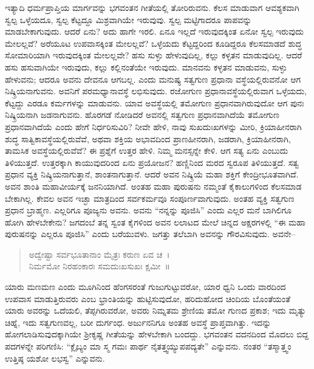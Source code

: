 ಇತ್ಯಾದಿ ಧರ್ಮಪ್ರಾಪ್ತಿಯ ಮಾರ್ಗವನ್ನು ಭಗವಂತನ ಗೀತೆಯಲ್ಲಿ ತೋರಿರುವನು. ಕೆಲಸ ಮಾಡುವಾಗ ಆವಶ್ಯಕವಾಗಿ ಸ್ವಲ್ಪ ಒಳ್ಳೆಯದೂ, ಸ್ವಲ್ಪ ಕೆಟ್ಟದ್ದೂ ಮಿಶ್ರವಾಗಿಯೇ ಇರುವುವು. ಸ್ವಲ್ಪ ಮಟ್ಟಿಗಾದರೂ ಪಾಪವನ್ನು ಮಾಡಬೇಕಾಗುವುದು. ಆದರೆ ಏನು? ಅದು ಹಾಗೇ ಇರಲಿ. ಏನೂ ಇಲ್ಲದೆ ಇರುವುದಕ್ಕಿಂತ ಏನೋ ಸ್ವಲ್ಪ ಇರುವುದು ಮೇಲಲ್ಲವೆ? ಅರೆಯೂಟ ಉಪವಾಸಕ್ಕಿಂತ ಮೇಲಲ್ಲವೆ? ಒಳ್ಳೆಯದು ಕೆಟ್ಟದ್ದರಿಂದ ಕೂಡಿದ್ದರೂ ಕೆಲಸ\-ಮಾಡದೆ ಶುದ್ಧ ಸೋಮಾರಿಯಾಗಿ ಇರುವುದಕ್ಕಿಂತ ಮೇಲಲ್ಲವೇ? ಹಸು ಸುಳ್ಳು ಹೇಳುವುದಿಲ್ಲ, ಕಲ್ಲು ಕಳ್ಳತನ ಮಾಡುವುದಿಲ್ಲ. ಆದರೆ ಹಸು ಹಸುವಾಗಿಯೇ ಇರುವುದು, ಕಲ್ಲು ಕಲ್ಲಿನಂತೆಯೇ ಇರುವುದು. ಮಾನವನು ಕಳ್ಳತನ ಮಾಡುವನು, ಸುಳ್ಳು ಹೇಳುವನು; ಆದರೂ ಅವನು ದೇವನೂ ಆಗಬಲ್ಲ. ಎಂದು ಮನುಷ್ಯ ಸತ್ವಗುಣ ಪ್ರಧಾನಾ ವಸ್ಥೆಯಲ್ಲಿರುವನೋ ಆಗ ನಿಷ್ಕ್ರಿಯನಾಗುವನು. ಅವನಿಗೆ ಪರಮಧ್ಯಾನಾವಸ್ಥೆ ಲಭಿಸುವುದು. ರಜೋಗುಣ ಪ್ರಧಾನಾವಸ್ಥೆಯಲ್ಲಿರುವಾಗ ಒಳ್ಳೆಯದು, ಕೆಟ್ಟದ್ದು ಎರಡೂ ಕರ್ಮಗಳನ್ನು ಮಾಡುವನು. ಯಾವ ಅವಸ್ಥೆಯಲ್ಲಿ ತಮೋಗುಣ ಪ್ರಧಾನವಾಗಿರುವುದೋ ಆಗ ಪುನಃ ನಿಷ್ಕ್ರಿಯನಾಗಿ ಜಡನಾಗುವನು. ಹೊರಗಡೆ ನೋಡಿದರೆ ಅವನಲ್ಲಿ ಸತ್ವಗುಣ ಪ್ರಧಾನವಾಗಿದೆಯೆ ತಮೋಗುಣ ಪ್ರಧಾನವಾಗಿದೆಯೆ ಎಂದು ಹೇಗೆ ನಿರ್ಧರಿಸುವಿರಿ? ನೀವೇ ಹೇಳಿ, ನಾವು ಸುಖದುಃಖಗಳನ್ನು ಮೀರಿ, ಕ್ರಿಯಾಹೀನರಾಗಿ ಶುದ್ಧ ಸಾತ್ವಿಕಾವಸ್ಥೆ\-ಯಲ್ಲಿರುವೆವೆ, ಅಥವಾ ಶಕ್ತಿಯ ಅಭಾವದಿಂದ ಪ್ರಾಣಹೀನರಾಗಿ, ಜಡರಾಗಿ, ಕ್ರಿಯಾಹೀನ\-ರಾಗಿ, ತಾಮಸಿಕ ಅವಸ್ಥೆಯಲ್ಲಿರುವೆವೆ? ಈ ಪ್ರಶ್ನೆಗೆ ಉತ್ತರ ಹೇಳಿ. ನಿಮ್ಮ ಮನಸ್ಸನ್ನೇ ಕೇಳಿ. ಆಗ ಸತ್ಯ ಏನು ಎಂಬುದು ತಿಳಿಯುತ್ತದೆ. ಉತ್ತರಕ್ಕಾಗಿ ಕಾಯುವುದರಿಂದ ಏನು ಪ್ರಯೋಜನ? ಹಣ್ಣಿನಿಂದ ಮರದ ಸ್ವರೂಪ ತಿಳಿಯುತ್ತದೆ. ಸತ್ವ ಪ್ರಧಾನ ವ್ಯಕ್ತಿ ನಿಷ್ಕ್ರಿಯನಾಗುತ್ತಾನೆ, ಶಾಂತನಾಗುತ್ತಾನೆ. ಆದರೆ ಅವನ ನಿಷ್ಕ್ರಿಯೆ ಮಹಾ ಶಕ್ತಿಗೆ ಕೇಂದ್ರೀ\-ಭೂತವಾಗಿದೆ. ಅವನ ಶಾಂತಿ ಮಹಾವೀರ್ಯಕ್ಕೆ ಜನನಿಯಾಗಿದೆ. ಅಂತಹ ಮಹಾ ಪುರುಷನು ನಮ್ಮಂತೆ ಕೈಕಾಲುಗಳಿಂದ ಕೆಲಸಮಾಡ ಬೇಕಾಗಿಲ್ಲ. ಕೇವಲ ಅವನ ಇಚ್ಛಾ ಮಾತ್ರದಿಂದ ಸರ್ವಕರ್ಮವೂ ಸಂಪೂರ್ಣವಾಗುವುದು. ಅಂತಹ ವ್ಯಕ್ತಿ ಸತ್ವಗುಣ ಪ್ರಧಾನ ಬ್ರಾಹ್ಮಣ. ಎಲ್ಲರಿಗೂ ಪೂಜ್ಯನು ಅವನು. ಅವನು “ನನ್ನನ್ನು ಪೂಜಿಸಿ” ಎಂದು ಎಲ್ಲರ ಮನೆ ಬಾಗಿಲಿಗೂ ಹೋಗಿ ಹೇಳಬೇಕೇನು? ಜಗದಂಬೆ ತನ್ನ ಸ್ವಂತ ಕೈಗಳಿಂದ ಅವನ ಲಲಾಟದ ಮೇಲೆ ಚಿನ್ನದ ಅಕ್ಷರಗಳಲ್ಲಿ “ಈ ಮಹಾ ಪುರುಷನನ್ನು ಎಲ್ಲರೂ ಪೂಜಿಸಿ” ಎಂದು ಬರೆಯುವಳು. ಜಗತ್ತು ತಲೆಬಾಗಿ ಅವನನ್ನು ಗೌರವಿಸುವುದು. ಅವನೇ–
\begin{verse}
ಅದ್ವೇಷ್ಟಾ ಸರ್ವಭೂತಾನಾಂ ಮೈತ್ರಃ ಕರುಣ ಏವ ಚ~।\\ನಿರ್ಮಮೋ ನಿರಹಂಕಾರಃ ಸಮದುಃಖಸುಖಃ ಕ್ಷಮೀ~॥
\end{verse}

ಯಾರು ಮಣಮಣ ಎಂದು ಮೂಗಿನಿಂದ ಹೆಂಗಸರಂತೆ ಗುಜುಗುಟ್ಟುವರೋ, ಯಾರ ಧ್ವನಿ ಒಂದು ವಾರದಿಂದ ಉಪವಾಸ ಮಾಡುತ್ತಿರುವರು ಎಂಬ ಭ್ರಾಂತಿಯನ್ನು ಹುಟ್ಟಿಸುವುದೋ, ಹರಿದುಹೋದ ಚಿಂದಿಯ ಬೊಂತೆಯಂತೆ ಯಾರು ಅವರನ್ನು ಒದೆಯಲಿ, ತೆಪ್ಪಗಿರುವರೋ, ಅವರು ನಿಮ್ನತಮ ಶ್ರೇಣಿಯ ತಮೋ ಗುಣದ ಪ್ರಕಾಶ; ಇದು ಮೃತ್ಯು ಚಿಹ್ನೆ, ಇದು ಸತ್ವಗುಣವಲ್ಲ, ಬರೀ ದುರ್ಗಂಧ. ಅರ್ಜುನನಿಗೂ ಅಂತಹ ಅವಸ್ಥೆ ಪ್ರಾಪ್ತವಾಗಿತ್ತು. ಇದನ್ನು ಹೋಗಲಾಡಿಸುವುದಕ್ಕಾಗಿಯೇ ಶ‍್ರೀಕೃಷ್ಣ ಗೀತೆಯನ್ನು ಹೇಳಬೇಕಾಗಿ ಬಂದದ್ದು. ಭಗವಂತನ ವದನದಿಂದ ಮೊದಲು ಬಿದ್ದ ಪದಗಳನ್ನೇ ಪರಿಗಣಿಸಿ: “ಕ್ಲೈಬ್ಯಂ ಮಾ ಸ್ಮ ಗಮಃ ಪಾರ್ಥ ನೈತತ್ತ್ವಯ್ಯುಪಪದ್ಯತೇ” ಎನ್ನುವನು. ನಂತರ “ತಸ್ಮಾತ್ತ್ವಂ ಉತ್ತಿಷ್ಠ ಯಶೋ ಲಭಸ್ವ” ಎನ್ನುವನು.

\vskip 6pt

